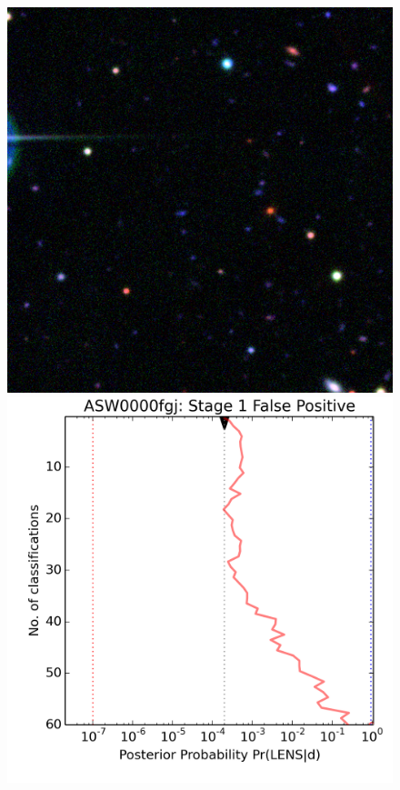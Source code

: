 \documentclass[useAMS,usenatbib,a4paper]{mn2e}
\begin{document}
\begin{figure}
\vspace{\baselineskip}

\begin{minipage}{\linewidth}
  \begin{minipage}[t]{0.47\linewidth}
    \begin{minipage}{0.46\linewidth}
      \centering\includegraphics[width=\linewidth]{sw-system-figs/ASW0000fgj_gri.png}
    \end{minipage}\hfill
    \begin{minipage}{0.50\linewidth}
      \centering\includegraphics[width=\linewidth]{sw-system-figs/ASW0000fgj_stage1_trajectory.png}

\end{minipage}
\end{minipage}
\end{minipage}
\end{figure}
\end{document}
